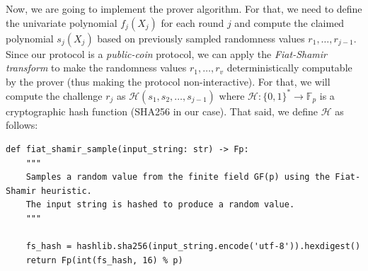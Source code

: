 Now, we are going to implement the prover algorithm. For that, we need to define
the univariate polynomial $f_j(X_j)$ for each round $j$ and compute the claimed
polynomial $s_j(X_j)$ based on previously sampled randomness values
$r_1,\dots,r_{j-1}$. Since our protocol is a \textit{public-coin} protocol, we
can apply the \textit{Fiat-Shamir transform} to make the randomness values
$r_1,\dots,r_v$ deterministically computable by the prover (thus making the
protocol non-interactive). For that, we will compute the challenge $r_j$ as
$\mathcal{H}(s_1, s_2, \dots, s_{j-1})$ where $\mathcal{H}: \{0,1\}^* \to
\mathbb{F}_p$ is a cryptographic hash function (SHA256 in our case). That 
said, we define $\mathcal{H}$ as follows:
\begin{verbatim}
def fiat_shamir_sample(input_string: str) -> Fp:
    """
    Samples a random value from the finite field GF(p) using the Fiat-Shamir heuristic.
    The input string is hashed to produce a random value.
    """

    fs_hash = hashlib.sha256(input_string.encode('utf-8')).hexdigest()
    return Fp(int(fs_hash, 16) % p)
\end{verbatim}

